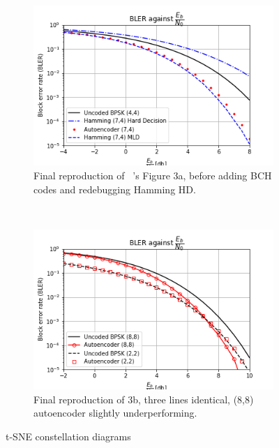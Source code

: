 \documentclass[12pt,onecolumn,letterpaper]{article}
\begin{document}
\begin{figure}[t!]
   \centering
  \begin{subfigure}[t]{0.45\textwidth}
       \centering
       \includegraphics[width=\linewidth]{figures/o_shea_3a_bler_vs_eb.png}
       \caption{Final reproduction of ~\cite{oShea}'s Figure 3a, before adding BCH codes and redebugging Hamming HD.}
       \label{fig:OSheaFigure3a}
   \end{subfigure}
   ~
   \begin{subfigure}[t]{0.45\textwidth}
       \centering
       \includegraphics[width=\linewidth]{figures/o_shea_3b_bler_vs_eb.png}
       \caption{Final reproduction of 3b, three lines identical, (8,8) autoencoder slightly underperforming.}
       \label{fig:OSheaFigure3b}
   \end{subfigure}
   \caption{t-SNE constellation diagrams}
   \label{fig:OSheaFig3}
\end{figure}
\end{document}
